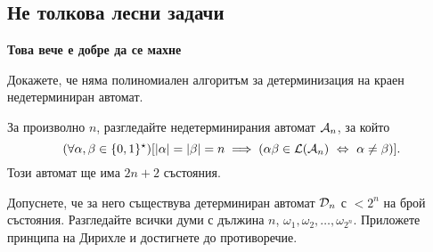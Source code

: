 \subsection{Не толкова лесни задачи}

{\bf Това вече е добре да се махне}
\begin{problem}
  Докажете, че няма полиномиален алгоритъм за детерминизация на краен недетерминиран автомат.
\end{problem}
\begin{hint}
  За произволно $n$, разгледайте недетерминирания автомат $\mathcal{A}_n$, за който
  \[(\forall \alpha,\beta \in \{0,1\}^\star)[|\alpha| = |\beta| = n \implies (\alpha\beta \in \mathcal{L}(\mathcal{A}_n) \ \Leftrightarrow\  \alpha \neq \beta)].\]
  Този автомат ще има $2n+2$ състояния.

  Допуснете, че за него съществува детерминиран автомат $\mathcal{D}_n$ с $< 2^n$ на брой състояния.
  Разгледайте всички думи с дължина $n$, $\omega_1,\omega_2,\dots,\omega_{2^n}$.
  Приложете принципа на Дирихле и достигнете до противоречие.
\end{hint}


